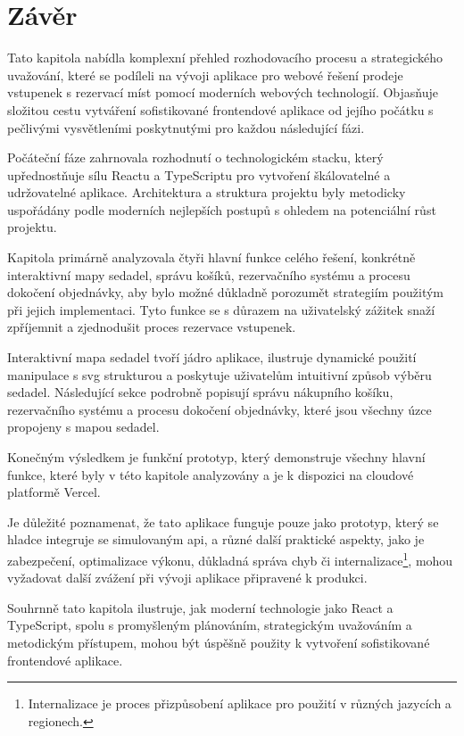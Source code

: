 \section{Závěr}
\label{sec:implementace-zaver}
Tato kapitola nabídla komplexní přehled rozhodovacího procesu a strategického uvažování, které se podíleli na vývoji aplikace pro webové řešení prodeje vstupenek s rezervací míst pomocí moderních webových technologií.
Objasňuje složitou cestu vytváření sofistikované frontendové aplikace od jejího počátku s pečlivými vysvětleními poskytnutými pro každou následující fázi.

Počáteční fáze zahrnovala rozhodnutí o technologickém stacku, který upřednostňuje sílu Reactu a TypeScriptu pro vytvoření škálovatelné a udržovatelné aplikace.
Architektura a struktura projektu byly metodicky uspořádány podle moderních nejlepších postupů s ohledem na potenciální růst projektu.

Kapitola primárně analyzovala čtyři hlavní funkce celého řešení, konkrétně interaktivní mapy sedadel, správu košíků, rezervačního systému a procesu dokočení objednávky, aby bylo možné důkladně porozumět strategiím použitým při jejich implementaci.
Tyto funkce se s důrazem na uživatelský zážitek snaží zpříjemnit a zjednodušit proces rezervace vstupenek.

Interaktivní mapa sedadel tvoří jádro aplikace, ilustruje dynamické použití manipulace s \ac{svg} strukturou a poskytuje uživatelům intuitivní způsob výběru sedadel.
Následující sekce podrobně popisují správu nákupního košíku, rezervačního systému a procesu dokočení objednávky, které jsou všechny úzce propojeny s mapou sedadel.

Konečným výsledkem je funkční prototyp, který demonstruje všechny hlavní funkce, které byly v této kapitole analyzovány a je k dispozici na cloudové platformě Vercel.

Je důležité poznamenat, že tato aplikace funguje pouze jako prototyp, který se hladce integruje se simulovaným \ac{api}, a různé další praktické aspekty, jako je zabezpečení, optimalizace výkonu, důkladná správa chyb či internalizace\footnote{Internalizace je proces přizpůsobení aplikace pro použití v různých jazycích a regionech.}, mohou vyžadovat další zvážení při vývoji aplikace připravené k produkci.

Souhrnně tato kapitola ilustruje, jak moderní technologie jako React a TypeScript, spolu s promyšleným plánováním, strategickým uvažováním a metodickým přístupem, mohou být úspěšně použity k vytvoření sofistikované frontendové aplikace.

